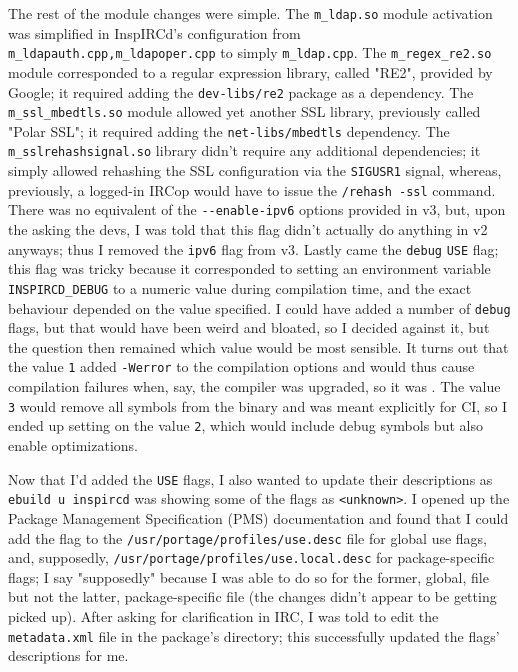 \documentclass{article}
\begin{document}
The rest of the module changes were simple.  The \texttt{m_ldap.so} module activation was simplified in InspIRCd's configuration from \texttt{m_ldapauth.cpp,m_ldapoper.cpp} to simply \texttt{m_ldap.cpp}.  The \texttt{m_regex_re2.so} module corresponded to a regular expression library, called "RE2", provided by Google; it required adding the \texttt{dev-libs/re2} package as a dependency.  The \texttt{m_ssl_mbedtls.so} module allowed yet another SSL library, previously called "Polar SSL"; it required adding the \texttt{net-libs/mbedtls} dependency.  The \texttt{m_sslrehashsignal.so} library didn't require any additional dependencies; it simply allowed rehashing the SSL configuration via the \texttt{SIGUSR1} signal, whereas, previously, a logged-in IRCop would have to issue the \texttt{/rehash -ssl} command.  There was no equivalent of the \verb|--enable-ipv6| options provided in v3, but, upon the asking the devs, I was told that this flag didn't actually do anything in v2 anyways; thus I removed the \texttt{ipv6} flag from v3.  Lastly came the \texttt{debug} \texttt{USE} flag; this flag was tricky because it corresponded to setting an environment variable \texttt{INSPIRCD_DEBUG} to a numeric value during compilation time, and the exact behaviour depended on the value specified.  I could have added a number of \texttt{debug} flags, but that would have been weird and bloated, so I decided against it, but the question then remained which value would be most sensible.  It turns out that the value \texttt{1} added \texttt{-Werror} to the compilation options and would thus cause compilation failures when, say, the compiler was upgraded, so it was .  The value \texttt{3} would remove all symbols from the binary and was meant explicitly for CI, so I ended up setting on the value \texttt{2}, which would include debug symbols but also enable optimizations.

Now that I'd added the \texttt{USE} flags, I also wanted to update their descriptions as \texttt{ebuild u inspircd} was showing some of the flags as \texttt{<unknown>}.  I opened up the Package Management Specification (PMS) documentation and found that I could add the flag to the \texttt{/usr/portage/profiles/use.desc} file for global use flags, and, supposedly, \texttt{/usr/portage/profiles/use.local.desc} for package-specific flags; I say "supposedly" because I was able to do so for the former, global, file but not the latter, package-specific file (the changes didn't appear to be getting picked up).  After asking for clarification in IRC, I was told to edit the \texttt{metadata.xml} file in the package's directory; this successfully updated the flags' descriptions for me.
\end{document}
